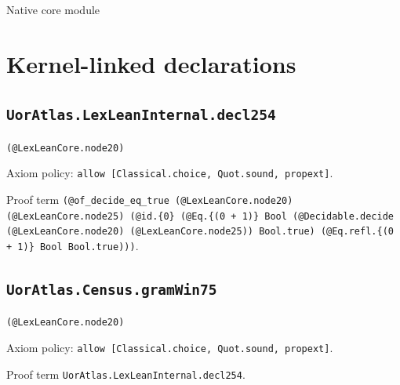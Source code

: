 \documentclass[11pt]{article}
\begin{document}
\begin{center}{\LARGE Native core module}\end{center}
\section*{Kernel-linked declarations}
\subsection*{\texttt{UorAtlas.LexLeanInternal.decl254}}
\noindent\texttt{(@LexLeanCore.node20)}\par
\noindent Axiom policy: \texttt{allow [Classical.choice, Quot.sound, propext]}.\par
\noindent Proof term \texttt{(@of\_decide\_eq\_true (@LexLeanCore.node20) (@LexLeanCore.node25) (@id.\{0\} (@Eq.\{(0 + 1)\} Bool (@Decidable.decide (@LexLeanCore.node20) (@LexLeanCore.node25)) Bool.true) (@Eq.refl.\{(0 + 1)\} Bool Bool.true)))}.\par
\subsection*{\texttt{UorAtlas.Census.gramWin75}}
\noindent\texttt{(@LexLeanCore.node20)}\par
\noindent Axiom policy: \texttt{allow [Classical.choice, Quot.sound, propext]}.\par
\noindent Proof term \texttt{UorAtlas.LexLeanInternal.decl254}.\par
\end{document}
